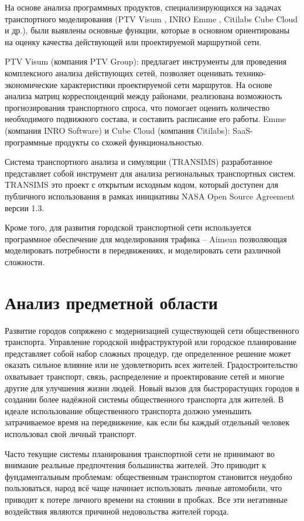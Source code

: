 На основе анализа программных продуктов, специализирующихся на задачах транспортного моделирования 
(PTV Visum \cite{bib:6}, INRO Emme \cite{bib:7}, Citilabs Cube Cloud \cite{bib:8} и др.), были выявлены 
основные функции, которые в основном ориентированы на оценку качества действующей или проектируемой 
маршрутной сети.

PTV Visum (компания PTV Group): предлагает инструменты для проведения комплексного анализа действующих 
сетей, позволяет оценивать технико-экономические характеристики проектируемой сети маршрутов. На основе 
анализа матриц корреспонденций между районами, реализована возможность прогнозирования транспортного спроса, 
что помогает оценить количество необходимого подвижного состава, и составить расписание его работы. 
Emme (компания INRO Software) и Cube Cloud (компания Citilabs): SaaS-программные продукты со схожей 
функциональностью.

Система транспортного анализа и симуляции (TRANSIMS) разработанное \cite{transims} представляет собой 
инструмент для анализа региональных транспортных систем. TRANSIMS это проект с открытым исходным кодом, 
который доступен для публичного использования в рамках инициативы NASA Open Source Agreement версии 1.3.

Кроме того, для развития городской транспортной сети используется программное обеспечение для моделирования 
трафика -- Aimsun позволяющая моделировать потребности в передвижениях, и моделировать сети различной 
сложности\cite{aimsun}.

\section{Анализ предметной области}
Развитие городов сопряжено с модернизацией существующей сети общественного транспорта. Управление городской 
инфраструктурой или городское планирование представляет собой набор сложных процедур, где определенное 
решение может оказать сильное влияние или не удовлетворить всех жителей. Градостроительство охватывает 
транспорт, связь, распределение и проектирование сетей и многие другие для улучшения жизни людей. Новый 
вызов для быстрорастущих городов в создании более надёжной системы общественного транспорта для жителей. 
В идеале использование общественного транспорта должно уменьшить затрачиваемое время на передвижение, как 
если бы каждый отдельный человек использовал свой личный транспорт.

Часто текущие системы планирования транспортной сети не принимают во внимание реальные предпочтения 
большинства жителей. Это приводит к фундаментальным проблемам: общественным транспортом становится неудобно 
пользоваться, народ всё чаще начинает использовать личные автомобили, что приводит к потере личного времени 
на стоянии в пробках. Все эти негативные воздействия являются причиной недовольства жителей города.

